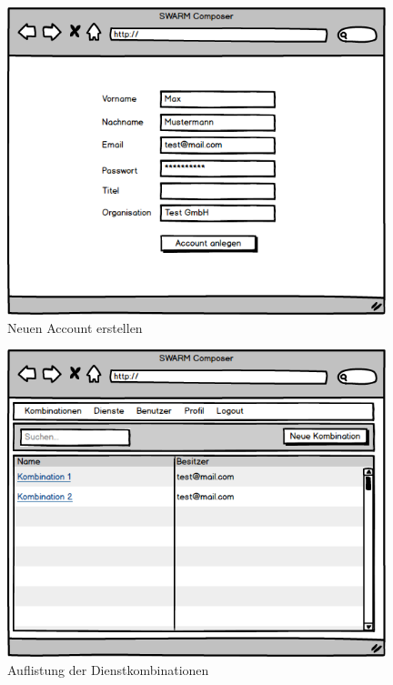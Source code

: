 \begin{figure}[ht]
	\centering
	\includegraphics[keepaspectratio,width=11cm]{img/webfrontend/Registrieren.png}
	\caption{Neuen Account erstellen}
\end{figure}
\begin{figure}[ht]
	\centering
	\includegraphics[keepaspectratio,width=11cm]{img/webfrontend/Kombinationen.png}
	\caption{Auflistung der Dienstkombinationen}
\end{figure}

